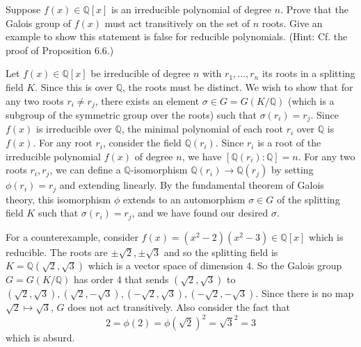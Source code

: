   \begin{exercise}[Shifrin 7.6.14]
    Suppose $f(x) \in \mathbb{Q}[x]$ is an irreducible polynomial of degree $n$. Prove that the Galois group of $f(x)$ must act transitively on the set of $n$ roots. Give an example to show this statement is false for reducible polynomials. (Hint: Cf. the proof of Proposition 6.6.)
  \end{exercise}
  \begin{solution}
    Let $f(x) \in \mathbb{Q}[x]$ be irreducible of degree $n$ with $r_1, \ldots, r_n$ its roots in a splitting field $K$. Since this is over $\mathbb{Q}$, the roots must be distinct. We wish to show that for any two roots $r_i \neq r_j$, there exists an element $\sigma \in G = G(K/\mathbb{Q})$ (which is a subgroup of the symmetric group over the roots) such that $\sigma(r_i) = r_j$. Since $f(x)$ is irreducible over $\mathbb{Q}$, the minimal polynomial of each root $r_i$ over $\mathbb{Q}$ is $f(x)$. For any root $r_i$, consider the field $\mathbb{Q}(r_i)$. Since $r_i$ is a root of the irreducible polynomial $f(x)$ of degree $n$, we have $[\mathbb{Q}(r_i): \mathbb{Q}] = n$. For any two roots $r_i, r_j$, we can define a $\mathbb{Q}$-isomorphism $\mathbb{Q}(r_i) \to \mathbb{Q}(r_j)$ by setting $\phi(r_i) = r_j$ and extending linearly. By the fundamental theorem of Galois theory, this isomorphism $\phi$ extends to an automorphism $\sigma \in G$ of the splitting field $K$ such that $\sigma(r_i) = r_j$, and we have found our desired $\sigma$. 

    For a counterexample, consider $f(x) = (x^2 - 2) (x^2 - 3) \in \mathbb{Q}[x]$ which is reducible. The roots are $\pm \sqrt{2}, \pm \sqrt{3}$ and so the splitting field is $K = \mathbb{Q}(\sqrt{2}, \sqrt{3})$ which is a vector space of dimension 4. So the Galois group $G = G(K/\mathbb{Q})$ has order 4 that sends $(\sqrt{2}, \sqrt{3})$ to $(\sqrt{2}, \sqrt{3}), (\sqrt{2}, -\sqrt{3}), (-\sqrt{2}, \sqrt{3}), (-\sqrt{2}, -\sqrt{3})$. Since there is no map $\sqrt{2} \mapsto \sqrt{3}$, $G$ does not act transitively. Also consider the fact that 
    \begin{equation}
      2 = \phi(2) = \phi(\sqrt{2})^2 = \sqrt{3}^2 = 3 
    \end{equation}
    which is absurd. 
  \end{solution}

